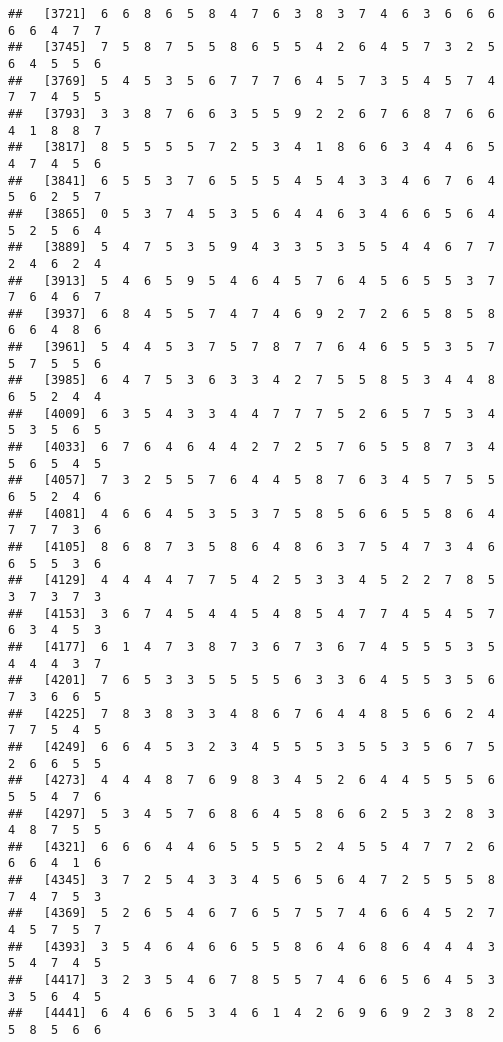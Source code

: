 \documentclass[
]{book}
\begin{document}
\begin{verbatim}
##   [3721]  6  6  8  6  5  8  4  7  6  3  8  3  7  4  6  3  6  6  6  6  6  4  7  7
##   [3745]  7  5  8  7  5  5  8  6  5  5  4  2  6  4  5  7  3  2  5  6  4  5  5  6
##   [3769]  5  4  5  3  5  6  7  7  7  6  4  5  7  3  5  4  5  7  4  7  7  4  5  5
##   [3793]  3  3  8  7  6  6  3  5  5  9  2  2  6  7  6  8  7  6  6  4  1  8  8  7
##   [3817]  8  5  5  5  5  7  2  5  3  4  1  8  6  6  3  4  4  6  5  4  7  4  5  6
##   [3841]  6  5  5  3  7  6  5  5  5  4  5  4  3  3  4  6  7  6  4  5  6  2  5  7
##   [3865]  0  5  3  7  4  5  3  5  6  4  4  6  3  4  6  6  5  6  4  5  2  5  6  4
##   [3889]  5  4  7  5  3  5  9  4  3  3  5  3  5  5  4  4  6  7  7  2  4  6  2  4
##   [3913]  5  4  6  5  9  5  4  6  4  5  7  6  4  5  6  5  5  3  7  7  6  4  6  7
##   [3937]  6  8  4  5  5  7  4  7  4  6  9  2  7  2  6  5  8  5  8  6  6  4  8  6
##   [3961]  5  4  4  5  3  7  5  7  8  7  7  6  4  6  5  5  3  5  7  5  7  5  5  6
##   [3985]  6  4  7  5  3  6  3  3  4  2  7  5  5  8  5  3  4  4  8  6  5  2  4  4
##   [4009]  6  3  5  4  3  3  4  4  7  7  7  5  2  6  5  7  5  3  4  5  3  5  6  5
##   [4033]  6  7  6  4  6  4  4  2  7  2  5  7  6  5  5  8  7  3  4  5  6  5  4  5
##   [4057]  7  3  2  5  5  7  6  4  4  5  8  7  6  3  4  5  7  5  5  6  5  2  4  6
##   [4081]  4  6  6  4  5  3  5  3  7  5  8  5  6  6  5  5  8  6  4  7  7  7  3  6
##   [4105]  8  6  8  7  3  5  8  6  4  8  6  3  7  5  4  7  3  4  6  6  5  5  3  6
##   [4129]  4  4  4  4  7  7  5  4  2  5  3  3  4  5  2  2  7  8  5  3  7  3  7  3
##   [4153]  3  6  7  4  5  4  4  5  4  8  5  4  7  7  4  5  4  5  7  6  3  4  5  3
##   [4177]  6  1  4  7  3  8  7  3  6  7  3  6  7  4  5  5  5  3  5  4  4  4  3  7
##   [4201]  7  6  5  3  3  5  5  5  5  6  3  3  6  4  5  5  3  5  6  7  3  6  6  5
##   [4225]  7  8  3  8  3  3  4  8  6  7  6  4  4  8  5  6  6  2  4  7  7  5  4  5
##   [4249]  6  6  4  5  3  2  3  4  5  5  5  3  5  5  3  5  6  7  5  2  6  6  5  5
##   [4273]  4  4  4  8  7  6  9  8  3  4  5  2  6  4  4  5  5  5  6  5  5  4  7  6
##   [4297]  5  3  4  5  7  6  8  6  4  5  8  6  6  2  5  3  2  8  3  4  8  7  5  5
##   [4321]  6  6  6  4  4  6  5  5  5  5  2  4  5  5  4  7  7  2  6  6  6  4  1  6
##   [4345]  3  7  2  5  4  3  3  4  5  6  5  6  4  7  2  5  5  5  8  7  4  7  5  3
##   [4369]  5  2  6  5  4  6  7  6  5  7  5  7  4  6  6  4  5  2  7  4  5  7  5  7
##   [4393]  3  5  4  6  4  6  6  5  5  8  6  4  6  8  6  4  4  4  3  5  4  7  4  5
##   [4417]  3  2  3  5  4  6  7  8  5  5  7  4  6  6  5  6  4  5  3  3  5  6  4  5
##   [4441]  6  4  6  6  5  3  4  6  1  4  2  6  9  6  9  2  3  8  2  5  8  5  6  6

\end{verbatim}
\end{document}
